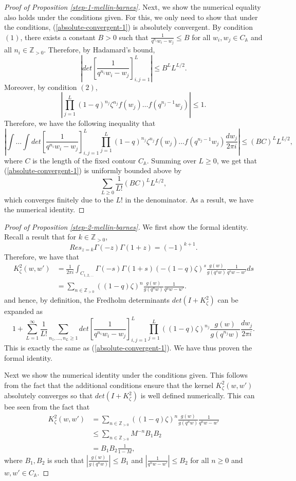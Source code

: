 \begin{proof}[Proof of Proposition \ref{step-1-mellin-barnes}]
Next, we show the numerical equality also holds under the conditions given. For this, we only need to show that under the conditions, (\ref{absolute-convergent-1}) is absolutely convergent. By condition $(1)$, there exists a constant $B > 0$ such that $\frac{1}{q^{n_i} w_i - w_j} \le B$ for all $w_i, w_j \in C_{\mathbb{A}}$ and all $n_i \in \mathbb{Z}_{>0}$. Therefore, by Hadamard's bound, $$\left| det\left[ \frac{1}{q^{n_i} w_i - w_j} \right]_{i,j=1}^{L} \right| \le B^L L^{L/2}.$$
Moreover, by condition $(2)$, $$\left| \prod_{j=1}^{L} (1-q)^{n_j} \zeta^{n_j} f(w_j) \dots f(q^{n_j-1} w_j) \right| \le 1.$$ Therefore, we have the following inequality that 
$$\left| \int \dots \int  det\left[ \frac{1}{q^{n_i} w_i - w_j} \right]_{i,j=1}^{L} \prod_{j=1}^{L} (1-q)^{n_j} \zeta^{n_j} f(w_j) \dots f(q^{n_j-1} w_j) \frac{dw_j}{2 \pi i} \right| \le (BC)^L L^{L/2},$$
where $C$ is the length of the fixed contour $C_{\mathbb{A}}$. Summing over $L \ge 0$, we get that (\ref{absolute-convergent-1}) is uniformly bounded above by $$\sum_{L \ge 0} \frac{1}{L!}(BC)^L L^{L/2},$$ which converges finitely due to the $L!$ in the denominator. As a result, we have the numerical identity.
\end{proof}
\begin{proof}[Proof of Proposition \ref{step-2-mellin-barnes}]
We first show the formal identity. Recall a result that for $k \in \mathbb{Z}_{> 0}$, $$Res_{z = k} \Gamma(-z) \Gamma(1+z) = (-1)^{k+1}.$$ Therefore, we have that
\begin{align*}
K_{\zeta}^2(w,w') &= \frac{1}{2 \pi i} \int_{C_{1,2,\dots}} \Gamma(-s) \Gamma(1+s) (-(1-q)\zeta)^s \frac{g(w)}{g(q^sw)} \frac{1}{q^sw - w'} ds\\
&= \sum_{n \in \mathbb{Z}_{>0}} ((1-q) \zeta)^n \frac{g(w)}{g(q^nw)} \frac{1}{q^n w - w'}.
\end{align*}
and hence, by definition, the Fredholm determinants $det(I+K_{\zeta}^2)$ can be expanded as
$$1 + \sum_{L=1}^{\infty} \frac{1}{L!} \sum_{n_1, \dots, n_L \ge 1} det\left[ \frac{1}{q^{n_i} w_i - w_j} \right]_{i,j = 1}^{L} \prod_{j=1}^{L} ((1-q)\zeta)^{n_j} \frac{g(w)}{g(q^{n_j} w)} \frac{dw_j}{2 \pi i}.$$
This is exactly the same as (\ref{absolute-convergent-1}). We have thus proven the formal identity.

Next we show the numerical identity under the conditions given. This follows from the fact that the additional conditions ensure that the kernel $K_{\zeta}^2(w,w')$ absolutely converges so that $det(I+K_{\zeta}^2)$ is well defined numerically. This can bee seen from the fact that 
\begin{align*}
K_{\zeta}^2(w,w') &= \sum_{n \in \mathbb{Z}_{>0}} ((1-q) \zeta)^n \frac{g(w)}{g(q^nw)} \frac{1}{q^n w - w'}\\
&\le \sum_{n \in \mathbb{Z}_{>0}} M^{-n} B_1 B_2\\
&= B_1 B_2 \frac{1}{1-M},
\end{align*}
where $B_1, B_2$ is such that $\left| \frac{g(w)}{g(q^nw)} \right| \le B_1$ and $\left| \frac{1}{q^n w - w'} \right| \le B_2$ for all $n \ge 0$ and $w, w' \in C_{\mathbb{A}}$.
\end{proof}

